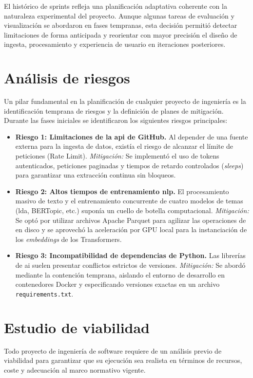 El histórico de sprints refleja una planificación adaptativa coherente con la
naturaleza experimental del proyecto. Aunque algunas tareas de evaluación y
visualización se abordaron en fases tempranas, esta decisión permitió detectar
limitaciones de forma anticipada y reorientar con mayor precisión el diseño de
ingesta, procesamiento y experiencia de usuario en iteraciones posteriores.

\section{Análisis de riesgos}
Un pilar fundamental en la planificación de cualquier proyecto de ingeniería es
la identificación temprana de riesgos y la definición de planes de mitigación.
Durante las fases iniciales se identificaron los siguientes riesgos
principales:

\begin{itemize}
    \item \textbf{Riesgo 1: Limitaciones de la \acrshort{api} de GitHub.} Al depender de una fuente externa para la ingesta de datos, existía el riesgo de alcanzar el límite de peticiones (Rate Limit). \textit{Mitigación:} Se implementó el uso de tokens autenticados, peticiones paginadas y tiempos de retardo controlados (\textit{sleeps}) para garantizar una extracción continua sin bloqueos.
    \item \textbf{Riesgo 2: Altos tiempos de entrenamiento \acrshort{nlp}.} El procesamiento masivo de texto y el entrenamiento concurrente de cuatro modelos de temas (\acrshort{lda}, BERTopic, etc.) suponía un cuello de botella computacional. \textit{Mitigación:} Se optó por utilizar archivos Apache Parquet para agilizar las operaciones de  en disco y se aprovechó la aceleración por GPU local para la instanciación de los \textit{embeddings} de los Transformers.
    \item \textbf{Riesgo 3: Incompatibilidad de dependencias de Python.} Las librerías de \acrshort{ai} suelen presentar conflictos estrictos de versiones. \textit{Mitigación:} Se abordó mediante la contención temprana, aislando el entorno de desarrollo en contenedores Docker y especificando versiones exactas en un archivo \texttt{requirements.txt}.
\end{itemize}

\section{Estudio de viabilidad}
Todo proyecto de ingeniería de software requiere de un análisis previo de
viabilidad para garantizar que su ejecución sea realista en términos de
recursos, coste y adecuación al marco normativo vigente.

